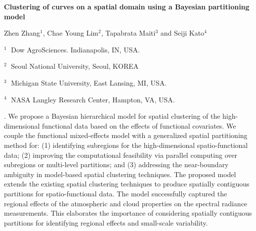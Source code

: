 \documentclass[12pt]{article}
\begin{document}
\begin{flushleft}


{\LARGE\bf Clustering of curves on a spatial domain using a Bayesian partitioning model}


\vspace{1.0cm}

Zhen Zhang$^1$, Chae Young Lim$^2$, Tapabrata Maiti$^3$ and Seiji Kato$^4$

\begin{description}

\item $^1 \;$ Dow AgroSciences. Indianapolis, IN, USA.

\item $^2 \;$ Seoul National University, Seoul, KOREA

\item $^3 \;$ Michigan State University, East Lansing, MI, USA.

\item $^4 \;$ NASA Langley Research Center, Hampton, VA, USA.




\end{description}

\end{flushleft}


\vspace{0.75cm}

. We propose a Bayesian hierarchical model for spatial clustering of the high-dimensional 
functional data based on the effects of functional covariates. 
We couple the functional mixed-effects model with a generalized spatial partitioning method for: 
(1) identifying subregions for the high-dimensional spatio-functional data; 
(2) improving the computational feasibility via parallel computing over subregions 
or multi-level partitions; and (3) addressing the near-boundary ambiguity in model-based 
spatial clustering techniques. The proposed model extends the existing spatial clustering 
techniques to produce spatially contiguous partitions for spatio-functional data. 
The model successfully captured the regional effects of the atmospheric and 
cloud properties on the spectral radiance measurements. 
This elaborates the importance of considering spatially contiguous partitions 
for identifying regional effects and small-scale variability. 
\vskip 2mm
\end{document}
